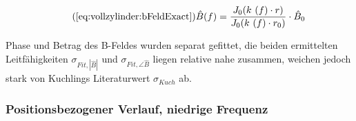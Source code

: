 {\begin{minipage}[t]{0.33\textwidth}
\begin{minipage}[t]{0.5\textwidth}
            \begin{equation}
                \tag{\ref{eq:vollzylinder:bFeldExact}}
                \hat{B} (f) = \frac{J_0 (k~(f) \cdot r)}{J_0 (k~(f) \cdot r_0)} \cdot \hat{B}_0
            \end{equation}

            Phase  und  Betrag  des  B-Feldes  wurden  separat  gefittet,  die
            beiden  ermittelten   Leitf\"ahigkeiten  $\sigma_{Fit,|\hat{B}|}$
            und  $\sigma_{Fit,\angle\hat{B}}$ liegen  relative nahe  zusammen,
            weichen jedoch  stark von Kuchlings  Literaturwert $\sigma_{Kuch}$
            ab.

        \end{minipage}

        \vspace{0.25em}

        \begin{minipage}[c][][b]{0.5\textwidth}
            \vspace{0pt}
            
        \end{minipage}%
        \begin{minipage}[c][][b]{0.5\textwidth}
            \hfill
            \resizebox{\textwidth}{!}{}
            \label{fig:alu:freq:sensor}
        \end{minipage}
	\end{minipage}%
	\begin{minipage}[t]{0.67\textwidth}
        \vspace{0pt}\raggedright
        \hfill
        \resizebox{.95\textwidth}{!}{}
        \label{fig:alu:freq:exact}
	\end{minipage}


    \subsubsection{Positionsbezogener Verlauf, niedrige Frequenz}
    \label{sec:ausw:subsec:hohlz:subsubsec:steel}

}
